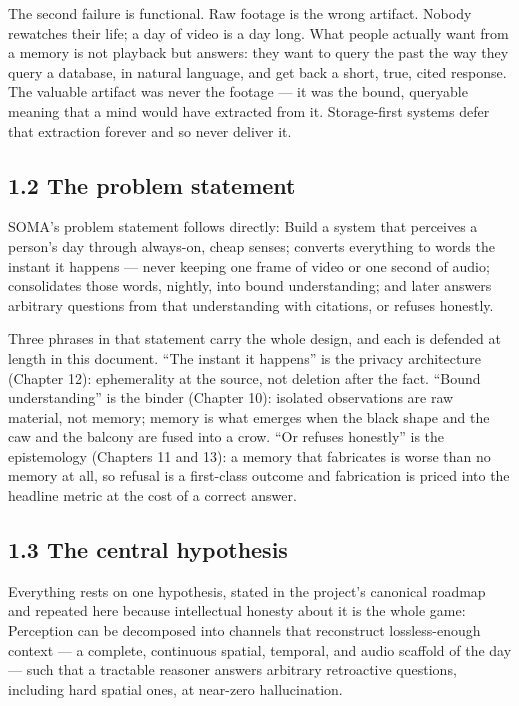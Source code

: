 The second failure is functional. Raw footage is the wrong artifact. Nobody rewatches their life; a day of video is a day long. What people actually want from a memory is not playback but answers: they want to query the past the way they query a database, in natural language, and get back a short, true, cited response. The valuable artifact was never the footage --- it was the bound, queryable meaning that a mind would have extracted from it. Storage-first systems defer that extraction forever and so never deliver it.

\subsection{1.2 The problem statement}\label{the-problem-statement}

SOMA's problem statement follows directly: Build a system that perceives a person's day through always-on, cheap senses; converts everything to words the instant it happens --- never keeping one frame of video or one second of audio; consolidates those words, nightly, into bound understanding; and later answers arbitrary questions from that understanding with citations, or refuses honestly.

Three phrases in that statement carry the whole design, and each is defended at length in this document. ``The instant it happens'' is the privacy architecture (Chapter 12): ephemerality at the source, not deletion after the fact. ``Bound understanding'' is the binder (Chapter 10): isolated observations are raw material, not memory; memory is what emerges when the black shape and the caw and the balcony are fused into a crow. ``Or refuses honestly'' is the epistemology (Chapters 11 and 13): a memory that fabricates is worse than no memory at all, so refusal is a first-class outcome and fabrication is priced into the headline metric at the cost of a correct answer.

\subsection{1.3 The central hypothesis}\label{the-central-hypothesis}

Everything rests on one hypothesis, stated in the project's canonical roadmap and repeated here because intellectual honesty about it is the whole game: Perception can be decomposed into channels that reconstruct lossless-enough context --- a complete, continuous spatial, temporal, and audio scaffold of the day --- such that a tractable reasoner answers arbitrary retroactive questions, including hard spatial ones, at near-zero hallucination.

